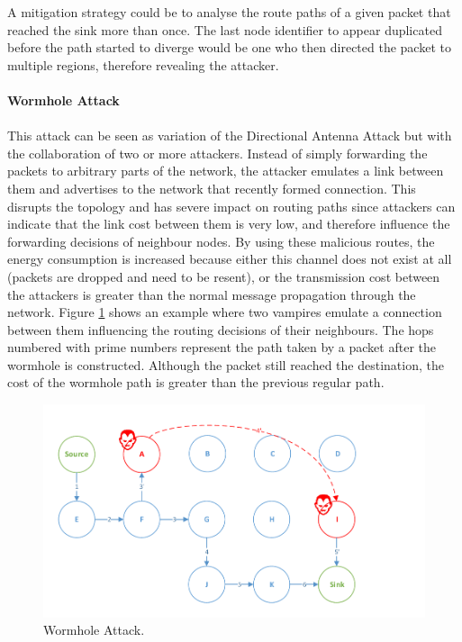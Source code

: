 A mitigation strategy could be to analyse the route paths of a given packet that reached the sink more than once. The last node identifier to appear duplicated before the path started to diverge would be one who then directed the packet to multiple regions, therefore revealing the attacker.

\paragraph{\textbf{Wormhole Attack}}
\paragraph{}
This attack can be seen as variation of the Directional Antenna Attack but with the collaboration of two or more attackers. Instead of simply forwarding the packets to arbitrary parts of the network, the attacker emulates a link between them and advertises to the network that recently formed connection. This disrupts the topology and has severe impact on routing paths since attackers can indicate that the link cost between them is very low, and therefore influence the forwarding decisions of neighbour nodes. By using these malicious routes, the energy consumption is increased because either this channel does not exist at all (packets are dropped and need to be resent), or the transmission cost between the attackers is greater than the normal message propagation through the network. Figure \ref{fig:wormhole_attack} shows an example where two vampires emulate a connection between them influencing the routing decisions of their neighbours. The hops numbered with prime numbers represent the path taken by a packet after the wormhole is constructed. Although the packet still reached the destination, the cost of the wormhole path is greater than the previous regular path.

\begin{figure}[h]
  \centering
  \includegraphics[width=0.85\linewidth]{figures/Wormhole_attack.pdf}
  \caption{Wormhole Attack.}
  \label{fig:wormhole_attack}
\end{figure} 


